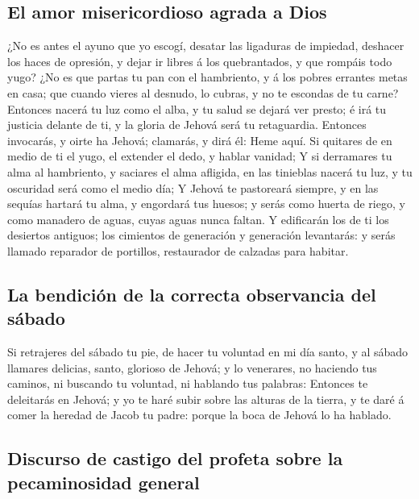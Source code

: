 \hypertarget{el-amor-misericordioso-agrada-a-dios}{%
\subsection{El amor misericordioso agrada a
Dios}\label{el-amor-misericordioso-agrada-a-dios}}

 ¿No es antes el ayuno que yo escogí, desatar las ligaduras
de impiedad, deshacer los haces de opresión, y dejar ir libres á los
quebrantados, y que rompáis todo yugo?  ¿No es que partas tu
pan con el hambriento, y á los pobres errantes metas en casa; que cuando
vieres al desnudo, lo cubras, y no te escondas de tu carne? 
Entonces nacerá tu luz como el alba, y tu salud se dejará ver presto; é
irá tu justicia delante de ti, y la gloria de Jehová será tu
retaguardia.  Entonces invocarás, y oirte ha Jehová;
clamarás, y dirá él: Heme aquí. Si quitares de en medio de ti el yugo,
el extender el dedo, y hablar vanidad;  Y si derramares tu
alma al hambriento, y saciares el alma afligida, en las tinieblas nacerá
tu luz, y tu oscuridad será como el medio día;  Y Jehová te
pastoreará siempre, y en las sequías hartará tu alma, y engordará tus
huesos; y serás como huerta de riego, y como manadero de aguas, cuyas
aguas nunca faltan.  Y edificarán los de ti los desiertos
antiguos; los cimientos de generación y generación levantarás: y serás
llamado reparador de portillos, restaurador de calzadas para habitar.

\hypertarget{la-bendiciuxf3n-de-la-correcta-observancia-del-suxe1bado}{%
\subsection{La bendición de la correcta observancia del
sábado}\label{la-bendiciuxf3n-de-la-correcta-observancia-del-suxe1bado}}

 Si retrajeres del sábado tu pie, de hacer tu voluntad en
mi día santo, y al sábado llamares delicias, santo, glorioso de Jehová;
y lo venerares, no haciendo tus caminos, ni buscando tu voluntad, ni
hablando tus palabras:  Entonces te deleitarás en Jehová; y
yo te haré subir sobre las alturas de la tierra, y te daré á comer la
heredad de Jacob tu padre: porque la boca de Jehová lo ha hablado.

\hypertarget{discurso-de-castigo-del-profeta-sobre-la-pecaminosidad-general}{%
\subsection{Discurso de castigo del profeta sobre la pecaminosidad
general}\label{discurso-de-castigo-del-profeta-sobre-la-pecaminosidad-general}}

